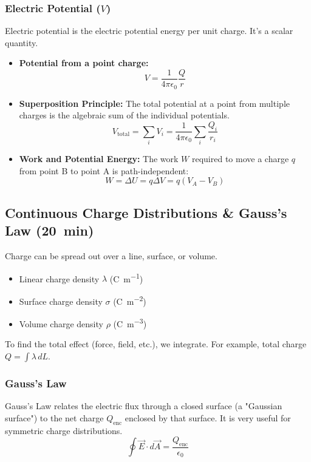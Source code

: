 \documentclass{article}
\numberwithin{equation}{section}
\begin{document}
\subsubsection{Electric Potential ($V$)}
Electric potential is the electric potential energy per unit charge. It's a scalar quantity.
\begin{itemize}
    \item \textbf{Potential from a point charge:}
    $$ V = \frac{1}{4\pi\epsilon_0} \frac{Q}{r} $$
    \item \textbf{Superposition Principle:} The total potential at a point from multiple charges is the algebraic sum of the individual potentials.
    $$ V_{\text{total}} = \sum_{i} V_i = \frac{1}{4\pi\epsilon_0} \sum_{i} \frac{Q_i}{r_i} $$
    \item \textbf{Work and Potential Energy:} The work $W$ required to move a charge $q$ from point B to point A is path-independent:
    $$ W = \Delta U = q\Delta V = q(V_A - V_B) $$
\end{itemize}

\subsection{Continuous Charge Distributions \& Gauss's Law (\SI{20}{min})}
Charge can be spread out over a line, surface, or volume.
\begin{itemize}
    \item Linear charge density $\lambda$ (\si{\coulomb\per\meter})
    \item Surface charge density $\sigma$ (\si{\coulomb\per\meter\squared})
    \item Volume charge density $\rho$ (\si{\coulomb\per\meter\cubed})
\end{itemize}
To find the total effect (force, field, etc.), we integrate. For example, total charge $Q = \int \lambda \,dL$.

\subsubsection{Gauss's Law}
Gauss's Law relates the electric flux through a closed surface (a "Gaussian surface") to the net charge $Q_{\text{enc}}$ enclosed by that surface. It is very useful for symmetric charge distributions.
$$ \oint \vec{E} \cdot d\vec{A} = \frac{Q_{\text{enc}}}{\epsilon_0} $$
\end{document}
